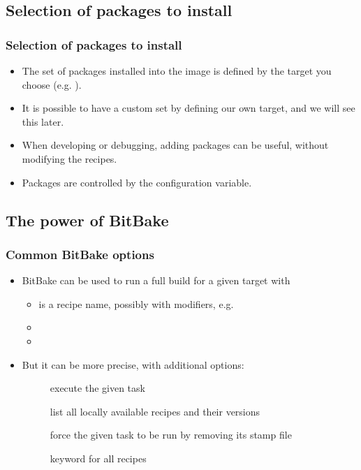 \subsection{Selection of packages to install}

\begin{frame}
  \frametitle{Selection of packages to install}
  \begin{itemize}
    \item The set of packages installed into the image is defined by
      the target you choose (e.g. ).
    \item It is possible to have a custom set by defining our own
      target, and we will see this later.
    \item When developing or debugging, adding packages can be useful,
      without modifying the recipes.
    \item Packages are controlled by the 
      configuration variable.
  \end{itemize}
\end{frame}

\subsection{The power of BitBake}

\begin{frame}
  \frametitle{Common BitBake options}
  \begin{itemize}
    \item BitBake can be used to run a full build for a given target
      with 
    \begin{itemize}
      \item {} is a recipe name, possibly with modifiers,
        e.g. 
      \item {}
      \item {}
    \end{itemize}
    \item But it can be more precise, with additional options:
    \begin{description}
      \item[] execute the given task
      \item[] list all locally available recipes and their
        versions
      \item[] force the given task to be run by removing its
        stamp file
      \item[] keyword for all recipes
    \end{description}
  \end{itemize}
\end{frame}

